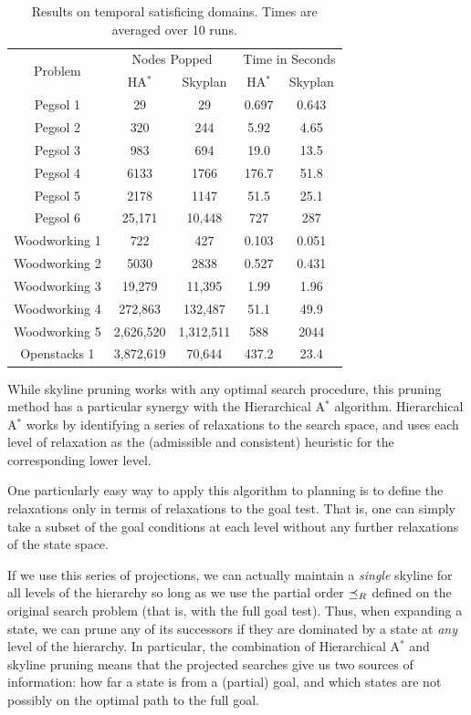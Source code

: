 \documentclass[letterpaper]{article}
\theoremstyle{plain} \newtheorem{theorem}{Theorem} \newtheorem{proposition}{Proposition} \newtheorem{lemma}{Lemma}
\theoremstyle{definition} \newtheorem{definition}{Definition} \newtheorem{conjecture}{Conjecture} \newtheorem*{example}{Example}
\theoremstyle{remark} \newtheorem*{remark}{Remark} \newtheorem*{note}{Note} \newtheorem{case}{Case}
\newcommand{\Astar}{A$^*$ }
\begin{document}
\begin{table}
	\begin{center}
		\begin{tabular}{|c|cc|cc|}
			\hline
			\multirow{2}{*}{Problem} & \multicolumn{2}{c|}{Nodes Popped} & \multicolumn{2}{c|}{Time in Seconds} \\
			& H\Astar & Skyplan & H\Astar & Skyplan \\
			\hline
			Pegsol 1 & 29 & 29 & 0.697 & 0.643 \\
			Pegsol 2 & 320 & 244 & 5.92 & 4.65 \\
			Pegsol 3 & 983 & 694 & 19.0 & 13.5 \\
			Pegsol 4 & 6133 & 1766 & 176.7 & 51.8 \\
			Pegsol 5 & 2178 & 1147 & 51.5 & 25.1 \\
			Pegsol 6 & 25,171 & 10,448 & 727 & 287 \\
			\hline
			Woodworking 1 & 722 & 427 & 0.103 & 0.051 \\
			Woodworking 2 & 5030 & 2838 & 0.527 & 0.431 \\
			Woodworking 3 & 19,279 & 11,395 & 1.99 & 1.96 \\
			Woodworking 4 & 272,863 & 132,487 & 51.1 & 49.9 \\
			Woodworking 5 & 2,626,520 & 1,312,511 & 588 & 2044 \\
			\hline
			Openstacks 1 & 3,872,619 & 70,644 & 437.2 & 23.4 \\
			\hline
		\end{tabular}
	\end{center}
	\caption{Results on temporal satisficing domains. Times are averaged over 10 runs.}
	\label{tab:tempo-sat}
\end{table}

While skyline pruning works with any optimal search procedure, this
pruning method has a particular synergy with the Hierarchical \Astar
algorithm. Hierarchical \Astar works
by identifying a series of relaxations to the search space, and
uses each level of relaxation as the (admissible and consistent)
heuristic for the corresponding lower level.

One particularly easy way to apply this algorithm to planning is
to define the relaxations only in terms of relaxations to the goal
test. That is, one can simply take a subset of the goal conditions
at each level without any further relaxations of the state space. 

If we use this series of projections, we can actually maintain a
\textit{single} skyline for all levels of the hierarchy so long as
we use the partial order $\preceq_R$ defined on the original search problem
(that is, with the full goal test). Thus, when expanding a 
state, we can prune any of its successors if they are dominated
by a state at \textit{any} level of the hierarchy.  In particular,
the combination of Hierarchical \Astar and skyline pruning means
that the projected searches give us two sources of information: how
far a state is from a (partial) goal, and which states are not
possibly on the optimal path to the full goal. 
\end{document}
